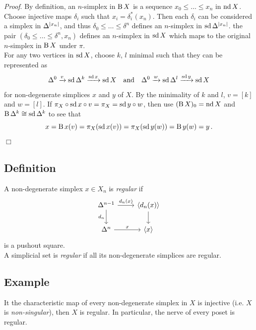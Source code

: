         \emph{Proof}. By definition, an $n$-simplex in $\operatorname{B} X$ is a sequence $x_0 \leq \ldots \leq x_n$ in $\operatorname{nd} X$. Choose injective maps $\delta_i$ such that $x_i = \delta^{*}_i(x_n)$. Then each $\delta_i$ can be considered a simplex in $\Delta^{\left| x_n \right|}$, and thus $\delta_0 \leq \ldots \leq \delta^n$ defines an $n$-simplex in $\operatorname{sd} \Delta^{\left| x_n \right|}$. the pair $(\delta_0 \leq \ldots \leq \delta^n, x_n)$ defines an $n$-simplex in $\operatorname{sd} X$ which maps to the original $n$-simplex in $\operatorname{B} X$ under $\pi$.\\
        For any two vertices in $\operatorname{sd} X$, choose $k$, $l$ minimal such that they can be represented as
        \begin{equation*}
            \Delta^0 \xrightarrow{v} \operatorname{sd} \Delta^k \xrightarrow{\operatorname{sd} x} \operatorname{sd} X \quad \text{and} \quad \Delta^0 \xrightarrow{w} \operatorname{sd} \Delta^l \xrightarrow{\operatorname{sd} y} \operatorname{sd} X 
        \end{equation*}
        for non-degenerate simplices $x$ and $y$ of $X$. By the minimality of $k$ and $l$, $v = [k]$ and $w = [l]$. If $\pi_X \circ \operatorname{sd} x \circ v = \pi_X = \operatorname{sd} y \circ w$, then use $(\operatorname{B} X)_0 = \operatorname{nd} X$ and $\operatorname{B} \Delta^k \cong \operatorname{sd} \Delta^k$ to see that
        \begin{equation*}
            x = \operatorname{B} x(v) = \pi_X(\operatorname{sd} x(v)) = \pi_X(\operatorname{sd} y(w)) = \operatorname{B} y(w) = y \,.
        \end{equation*}
        \quad\hfill$\Box$

    \subsection{Definition}\label{chV-5-15}
        A non-degenerate simplex $x \in X_n$ is \emph{regular} if
        \begin{equation*}
            \begin{tikzcd}
                \Delta^{n-1} \arrow[d, "d_n"'] \arrow[r, "{d_n(x)}"] & \langle d_n(x) \rangle \arrow[d] \\
                \Delta^n \arrow[r, "x"] & \langle x \rangle
            \end{tikzcd}
        \end{equation*}
        is a pushout square.\\
        A simplicial set is \emph{regular} if all its non-degenerate simplices are regular.

    \subsection{Example}\label{chV-5-16}
        It the characteristic map of every non-degenerate simplex in $X$ is injective (i.e. $X$ is \emph{non-singular}), then $X$ is regular. In particular, the nerve of every poset is regular.

